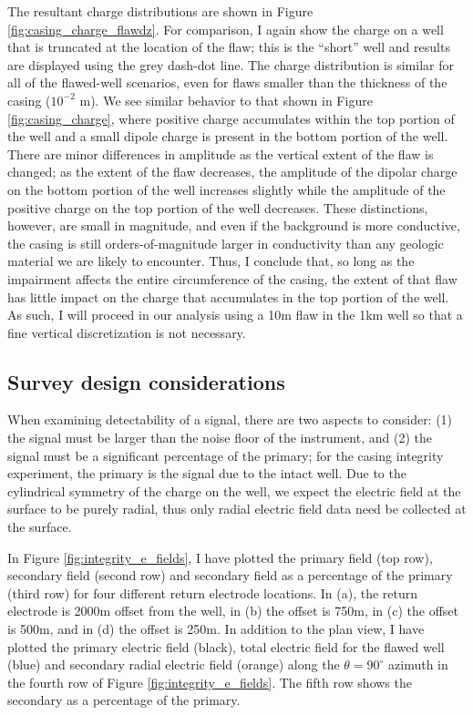 The resultant charge distributions are shown in Figure \ref{fig:casing_charge_flawdz}. For comparison, I again show the charge on a well that is truncated at the location of the flaw; this is the  ``short'' well and results are displayed using the grey dash-dot line. The charge distribution is similar for all of the flawed-well scenarios, even for flaws smaller than the thickness of the casing ($10^{-2}$ m). We see similar behavior to that shown in Figure \ref{fig:casing_charge}, where positive charge accumulates within the top portion of the well and a small dipole charge is present in the bottom portion of the well. There are minor differences in amplitude as the vertical extent of the flaw is changed; as the extent of the flaw decreases, the amplitude of the dipolar charge on the bottom portion of the well increases slightly while the amplitude of the positive charge on the top portion of the well decreases. These distinctions, however, are small in magnitude, and even if the background is more conductive, the casing is still orders-of-magnitude larger in conductivity than any geologic material we are likely to encounter. Thus, I conclude that, so long as the impairment affects the entire circumference of the casing, the extent of that flaw has little impact on the charge that accumulates in the top portion of the well. As such, I will proceed in our analysis using a 10m flaw in the 1km well so that a fine vertical discretization is not necessary.




\subsection{Survey design considerations}

When examining detectability of a signal, there are two aspects to consider: (1) the signal must be larger than the noise floor of the instrument, and (2) the signal must be a significant percentage of the primary; for the casing integrity experiment, the primary is the signal due to the intact well. Due to the cylindrical symmetry of the charge on the well, we expect the electric field at the surface to be purely radial, thus only radial electric field data need be collected at the surface.

In Figure \ref{fig:integrity_e_fields}, I have plotted the primary field (top row), secondary field (second row) and secondary field as a percentage of the primary (third row) for four different return electrode locations. In (a), the return electrode is 2000m offset from the well, in (b) the offset is 750m, in (c) the offset is 500m, and in (d) the offset is 250m. In addition to the plan view, I have plotted the primary electric field (black),  total electric field for the flawed well (blue) and secondary radial electric field (orange) along the $\theta = 90^\circ$ azimuth in the fourth row of Figure \ref{fig:integrity_e_fields}. The fifth row shows the secondary as a percentage of the primary.




